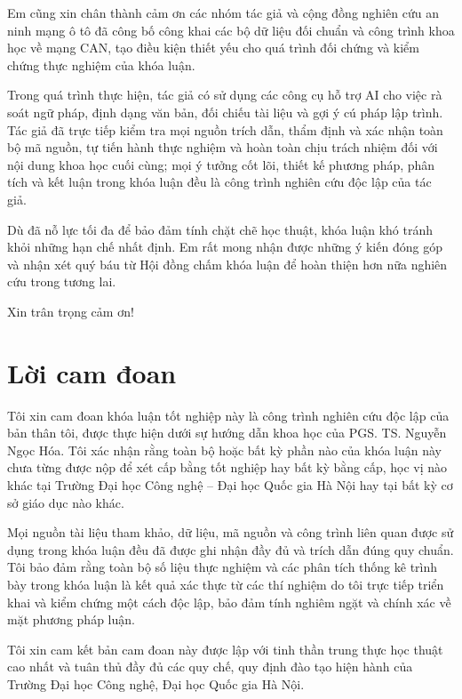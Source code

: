 \documentclass[12pt, a4paper, reqno, oneside]{book}
\newcommand\chap[1]{%
  \clearpage\phantomsection%
  \chapter*{#1}%
  \addcontentsline{toc}{chapter}{#1}%
  \markboth{#1}{}%
}
\begin{document}
Em cũng xin chân thành cảm ơn các nhóm tác giả và cộng đồng nghiên cứu an ninh mạng ô tô đã công bố công khai các bộ dữ liệu đối chuẩn và công trình khoa học về mạng CAN, tạo điều kiện thiết yếu cho quá trình đối chứng và kiểm chứng thực nghiệm của khóa luận.

Trong quá trình thực hiện, tác giả có sử dụng các công cụ hỗ trợ AI cho việc rà soát ngữ pháp, định dạng văn bản, đối chiếu tài liệu và gợi ý cú pháp lập trình. Tác giả đã trực tiếp kiểm tra mọi nguồn trích dẫn, thẩm định và xác nhận toàn bộ mã nguồn, tự tiến hành thực nghiệm và hoàn toàn chịu trách nhiệm đối với nội dung khoa học cuối cùng; mọi ý tưởng cốt lõi, thiết kế phương pháp, phân tích và kết luận trong khóa luận đều là công trình nghiên cứu độc lập của tác giả.

Dù đã nỗ lực tối đa để bảo đảm tính chặt chẽ học thuật, khóa luận khó tránh khỏi những hạn chế nhất định. Em rất mong nhận được những ý kiến đóng góp và nhận xét quý báu từ Hội đồng chấm khóa luận để hoàn thiện hơn nữa nghiên cứu trong tương lai.

Xin trân trọng cảm ơn!

\newpage

\chap{Lời cam đoan}
\vspace{20pt}
Tôi xin cam đoan khóa luận tốt nghiệp này là công trình nghiên cứu độc lập của bản thân tôi, được thực hiện dưới sự hướng dẫn khoa học của PGS. TS. Nguyễn Ngọc Hóa. Tôi xác nhận rằng toàn bộ hoặc bất kỳ phần nào của khóa luận này chưa từng được nộp để xét cấp bằng tốt nghiệp hay bất kỳ bằng cấp, học vị nào khác tại Trường Đại học Công nghệ -- Đại học Quốc gia Hà Nội hay tại bất kỳ cơ sở giáo dục nào khác.

Mọi nguồn tài liệu tham khảo, dữ liệu, mã nguồn và công trình liên quan được sử dụng trong khóa luận đều đã được ghi nhận đầy đủ và trích dẫn đúng quy chuẩn. Tôi bảo đảm rằng toàn bộ số liệu thực nghiệm và các phân tích thống kê trình bày trong khóa luận là kết quả xác thực từ các thí nghiệm do tôi trực tiếp triển khai và kiểm chứng một cách độc lập, bảo đảm tính nghiêm ngặt và chính xác về mặt phương pháp luận.

Tôi xin cam kết bản cam đoan này được lập với tinh thần trung thực học thuật cao nhất và tuân thủ đầy đủ các quy chế, quy định đào tạo hiện hành của Trường Đại học Công nghệ, Đại học Quốc gia Hà Nội.
\end{document}
